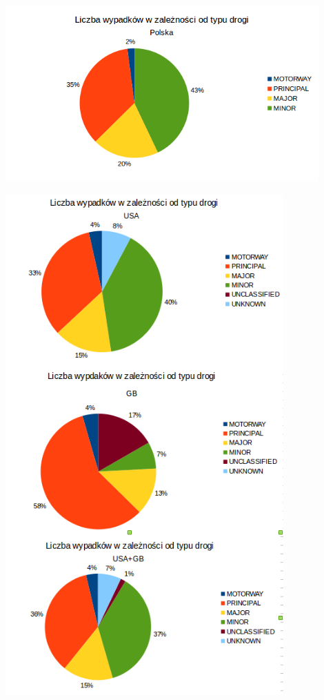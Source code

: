 \centerline{\includegraphics[width=0.9\textwidth]{images/statistics/road_type_pl.png}}

\centerline{\includegraphics[width=0.8\textwidth]{images/statistics/road_type.png}}


